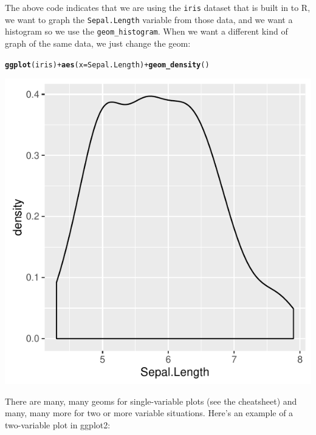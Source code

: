 \documentclass[12pt]{article}\usepackage[]{graphicx}\usepackage[]{color}
\makeatletter
\def\maxwidth{ %
  \ifdim\Gin@nat@width>\linewidth
    \linewidth
  \else
    \Gin@nat@width
  \fi
}
\newcommand{\hlopt}[1]{\textcolor[rgb]{0,0,0}{#1}}%
\newcommand{\hlstd}[1]{\textcolor[rgb]{0.345,0.345,0.345}{#1}}%
\newcommand{\hlkwc}[1]{\textcolor[rgb]{0.333,0.667,0.333}{#1}}%
\newcommand{\hlkwd}[1]{\textcolor[rgb]{0.737,0.353,0.396}{\textbf{#1}}}%
\newenvironment{kframe}{%
 \def\at@end@of@kframe{}%
 \ifinner\ifhmode%
  \def\at@end@of@kframe{\end{minipage}}%
  \begin{minipage}{\columnwidth}%
 \fi\fi%
 \def\FrameCommand##1{\hskip\@totalleftmargin \hskip-\fboxsep
 \colorbox{shadecolor}{##1}\hskip-\fboxsep
     \hskip-\linewidth \hskip-\@totalleftmargin \hskip\columnwidth}%
 \MakeFramed {\advance\hsize-\width
   \@totalleftmargin\z@ \linewidth\hsize
   \@setminipage}}%
 {\par\unskip\endMakeFramed%
 \at@end@of@kframe}
\newenvironment{knitrout}{}{} %
\makeatother
\begin{document}
The above code indicates that we are using the \texttt{iris} dataset that is built in to R, we want to graph the \texttt{Sepal.Length} variable from those data, and we want a histogram so we use the \texttt{geom\_histogram}. When we want a different kind of graph of the same data, we just change the geom:

\begin{knitrout}
\color{fgcolor}\begin{kframe}
\begin{alltt}
\hlkwd{ggplot}\hlstd{(iris)} \hlopt{+} \hlkwd{aes}\hlstd{(}\hlkwc{x} \hlstd{= Sepal.Length)} \hlopt{+} \hlkwd{geom_density}\hlstd{()}
\end{alltt}
\end{kframe}
\includegraphics[width=\maxwidth]{figure/unnamed-chunk-3-1} 

\end{knitrout}

There are many, many geoms for single-variable plots (see the cheatsheet) and many, many more for two or more variable situations. Here's an example of a two-variable plot in ggplot2:
\end{document}
